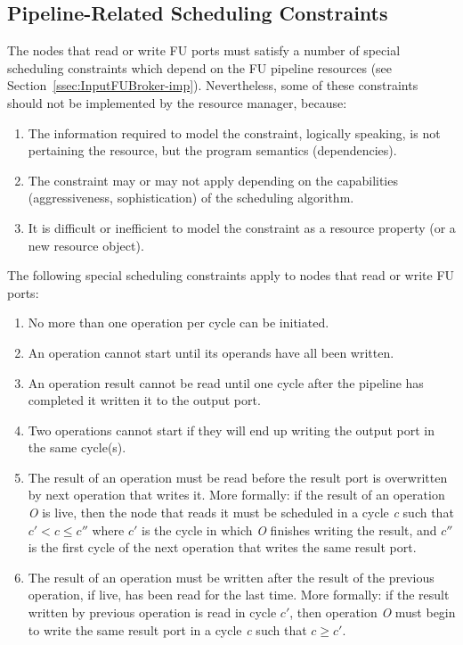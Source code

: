 \documentclass[a4paper,twoside]{tce}
\begin{document}
\subsection{Pipeline-Related Scheduling Constraints}

The nodes that read or write FU ports must satisfy a number of special
scheduling constraints which depend on the FU pipeline resources (see
Section~\ref{ssec:InputFUBroker-imp}). Nevertheless, some of these
constraints should not be implemented by the resource manager, because:
\begin{enumerate}
\item %
  The information required to model the constraint, logically speaking, is
  not pertaining the resource, but the program semantics (dependencies).
\item %
  The constraint may or may not apply depending on the capabilities
  (aggressiveness, sophistication) of the scheduling algorithm.
\item %
  It is difficult or inefficient to model the constraint as a resource
  property (or a new resource object).
\end{enumerate}

The following special scheduling constraints apply to nodes that read or
write FU ports:
\begin{enumerate}
\item\label{itm:one-start}%
  No more than one operation per cycle can be initiated.
\item\label{itm:operands-ready}%
  An operation cannot start until its operands have all been written.
\item\label{itm:latency}%
  An  operation result cannot be read until one cycle after the pipeline has
  completed it written it to the output port.
\item\label{itm:write-concurrent}%
  Two operations cannot start if they will end up writing the output port in
  the same cycle(s).
\item\label{itm:write-before}%
  The result of an operation must be read before the result port is
  overwritten by next operation that writes it. More formally: if the result
  of an operation \emph{O} is live, then the node that reads it must be
  scheduled in a cycle \emph{c} such that $c' < c \leq c''$ where $c'$ is
  the cycle in which \emph{O} finishes writing the result, and $c''$ is the
  first cycle of the next operation that writes the same result port.
\item\label{itm:write-after}%
  The result of an operation must be written after the result of the
  previous operation, if live, has been read for the last time. More
  formally: if the result written by previous operation is read in cycle
  $c'$, then operation \emph{O} must begin to write the same result port in
  a cycle \emph{c} such that $c \ge c'$.
\end{enumerate}
\end{document}
